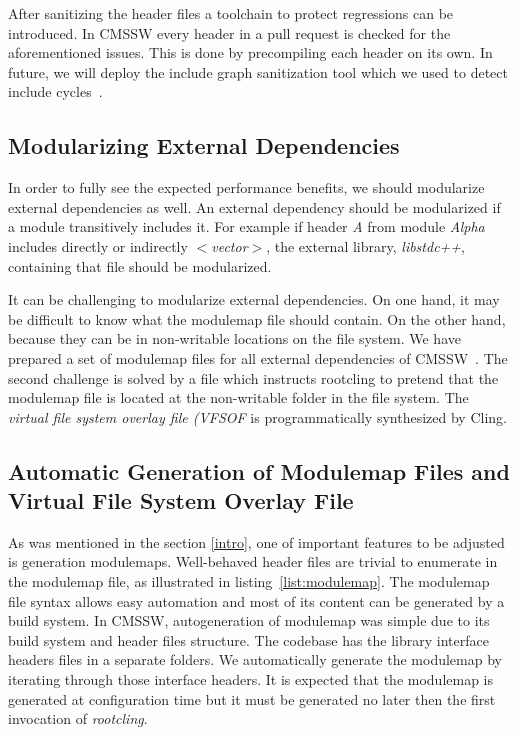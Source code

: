 \documentclass[12pt]{iopart}
\begin{document}
After sanitizing the header files a toolchain to protect regressions can be introduced. In CMSSW every header in a pull request is checked for the aforementioned issues. This is done by precompiling each header on its own. In future, we will deploy the include graph sanitization tool which we used to detect include cycles~\cite{scram-cycle-break}.

\subsection{Modularizing External Dependencies}

In order to fully see the expected performance benefits, we should modularize external dependencies as well. An external dependency should be modularized if a module transitively includes it. For example if header \textit{A} from module \textit{Alpha} includes directly or indirectly \textit{$<$vector$>$}, the external library, \textit{libstdc++}, containing that file should be modularized.

It can be challenging to modularize external dependencies. On one hand, it may be difficult to know what the modulemap file should contain. On the other hand, because they can be in non-writable locations on the file system. We have prepared a set of modulemap files for all external dependencies of CMSSW~\cite{raphael-auto-Modules}. The second challenge is solved by a file which instructs rootcling to pretend that the modulemap file is located at the non-writable folder in the file system. The \textit{virtual file system overlay file (VFSOF} is programmatically synthesized by Cling.

\subsection{Automatic Generation of Modulemap Files and Virtual File System Overlay File}
\label{autogen}

As was mentioned in the section \ref{intro}, one of important features to be adjusted is generation modulemaps. Well-behaved header files are trivial to enumerate in the modulemap file, as illustrated in listing~\ref{list:modulemap}. The modulemap file syntax allows easy automation and most of its content can be generated by a build system. In CMSSW, autogeneration of modulemap was simple due to its build system and header files structure. The codebase has the library interface headers files in a separate folders. We automatically generate the modulemap by iterating through those interface headers. It is expected that the modulemap is generated at configuration time but it must be generated no later then the first invocation of \textit{rootcling}.
\end{document}

